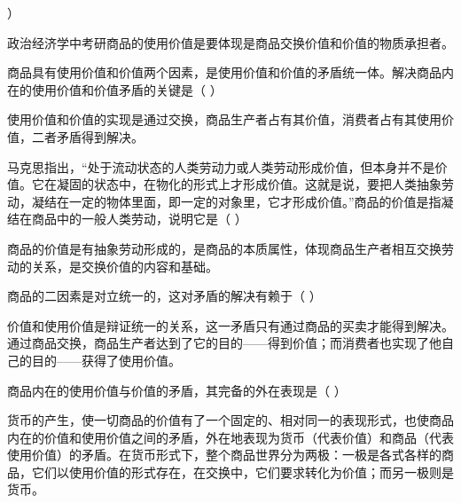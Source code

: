 ）
\par{}
\begin{solution}政治经济学中考研商品的使用价值是要体现是商品交换价值和价值的物质承担者。
\end{solution}
\question 商品具有使用价值和价值两个因素，是使用价值和价值的矛盾统一体。解决商品内在的使用价值和价值矛盾的关键是（
）
\par{}
\begin{solution}使用价值和价值的实现是通过交换，商品生产者占有其价值，消费者占有其使用价值，二者矛盾得到解决。
\end{solution}
\question 马克思指出，``处于流动状态的人类劳动力或人类劳动形成价值，但本身并不是价值。它在凝固的状态中，在物化的形式上才形成价值。这就是说，要把人类抽象劳动，凝结在一定的物体里面，即一定的对象里，它才形成价值。''商品的价值是指凝结在商品中的一般人类劳动，说明它是（
）
\par\twoch{\textcolor{red}{商品的本质属性}}{\textcolor{red}{由抽象劳动形成的}}{\textcolor{red}{体现商品生产者相互交换劳动的关系}}{\textcolor{red}{交换价值的内容和基础}}
\begin{solution}商品的价值是有抽象劳动形成的，是商品的本质属性，体现商品生产者相互交换劳动的关系，是交换价值的内容和基础。
\end{solution}
\question 商品的二因素是对立统一的，这对矛盾的解决有赖于（ ）
\par{}
\begin{solution}价值和使用价值是辩证统一的关系，这一矛盾只有通过商品的买卖才能得到解决。通过商品交换，商品生产者达到了它的目的------得到价值；而消费者也实现了他自己的目的------获得了使用价值。
\end{solution}
\question 商品内在的使用价值与价值的矛盾，其完备的外在表现是（ ）
\par{}
\begin{solution}货币的产生，使一切商品的价值有了一个固定的、相对同一的表现形式，也使商品内在的价值和使用价值之间的矛盾，外在地表现为货币（代表价值）和商品（代表使用价值）的矛盾。在货币形式下，整个商品世界分为两极：一极是各式各样的商品，它们以使用价值的形式存在，在交换中，它们要求转化为价值；而另一极则是货币。
\end{solution}
